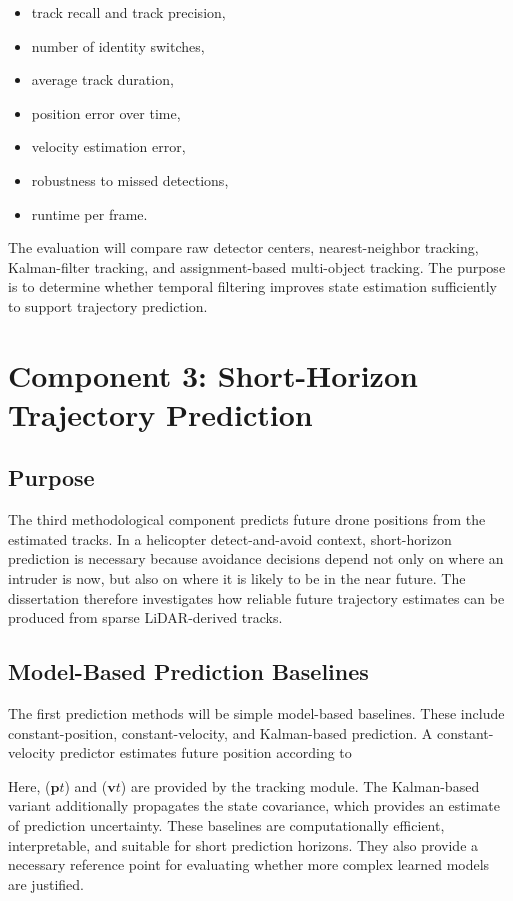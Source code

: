 \begin{itemize}
\item track recall and track precision,
\item number of identity switches,
\item average track duration,
\item position error over time,
\item velocity estimation error,
\item robustness to missed detections,
\item runtime per frame.
\end{itemize}

The evaluation will compare raw detector centers, nearest-neighbor tracking, Kalman-filter tracking, and assignment-based multi-object tracking. The purpose is to determine whether temporal filtering improves state estimation sufficiently to support trajectory prediction.

\section{Component 3: Short-Horizon Trajectory Prediction}

\subsection{Purpose}

The third methodological component predicts future drone positions from the estimated tracks. In a helicopter detect-and-avoid context, short-horizon prediction is necessary because avoidance decisions depend not only on where an intruder is now, but also on where it is likely to be in the near future. The dissertation therefore investigates how reliable future trajectory estimates can be produced from sparse LiDAR-derived tracks.

\subsection{Model-Based Prediction Baselines}

The first prediction methods will be simple model-based baselines. These include constant-position, constant-velocity, and Kalman-based prediction. A constant-velocity predictor estimates future position according to
\begin{math}
[
\mathbf{p}{t}
+
\mathbf{v}{t}\Delta t.
]
\end{math}

Here, ($\mathbf{p}{t}$) and ($\mathbf{v}{t}$) are provided by the tracking module. The Kalman-based variant additionally propagates the state covariance, which provides an estimate of prediction uncertainty. These baselines are computationally efficient, interpretable, and suitable for short prediction horizons. They also provide a necessary reference point for evaluating whether more complex learned models are justified.


